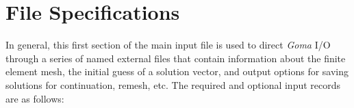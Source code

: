 \section{File Specifications}
%
%
In general, this first section of the main input file is used to direct \emph{Goma} I/O through a series of named external files that contain information about the finite element mesh, the initial guess of a solution vector, and output options for saving solutions for continuation, remesh, etc. The required and optional input records are as follows:
%
